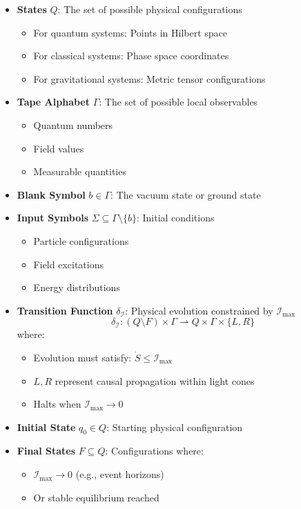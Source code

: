 \documentclass[12pt]{article}
\begin{document}
\begin{itemize}
    \item \textbf{States} \(Q\): The set of possible physical configurations
    \begin{itemize}
        \item For quantum systems: Points in Hilbert space
        \item For classical systems: Phase space coordinates
        \item For gravitational systems: Metric tensor configurations
    \end{itemize}

    \item \textbf{Tape Alphabet} \(\Gamma\): The set of possible local observables
    \begin{itemize}
        \item Quantum numbers
        \item Field values
        \item Measurable quantities
    \end{itemize}

    \item \textbf{Blank Symbol} \(b \in \Gamma\): The vacuum state or ground state

    \item \textbf{Input Symbols} \(\Sigma \subseteq \Gamma \setminus \{b\}\): Initial conditions
    \begin{itemize}
        \item Particle configurations
        \item Field excitations
        \item Energy distributions
    \end{itemize}

    \item \textbf{Transition Function} \(\delta_{\mathcal{I}}\): Physical evolution constrained by \(\mathcal{I}_{\text{max}}\)
    \[
    \delta_{\mathcal{I}}: (Q \setminus F) \times \Gamma \rightharpoonup Q \times \Gamma \times \{L,R\}
    \]
    where:
    \begin{itemize}
        \item Evolution must satisfy: \(\dot{S} \leq \mathcal{I}_{\text{max}}\)
        \item \(L,R\) represent causal propagation within light cones
        \item Halts when \(\mathcal{I}_{\text{max}} \to 0\)
    \end{itemize}

    \item \textbf{Initial State} \(q_0 \in Q\): Starting physical configuration

    \item \textbf{Final States} \(F \subseteq Q\): Configurations where:
    \begin{itemize}
        \item \(\mathcal{I}_{\text{max}} \to 0\) (e.g., event horizons)
        \item Or stable equilibrium reached
    \end{itemize}
\end{itemize}
\end{document}
